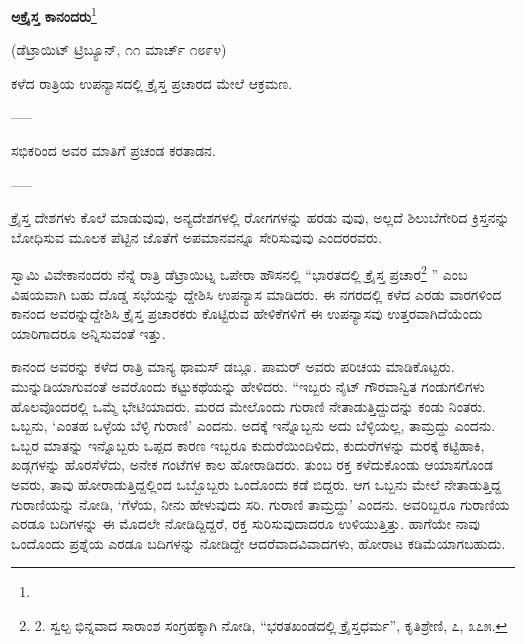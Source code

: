 \begin{center}
\textbf{ಅಕ್ರೈಸ್ತ ಕಾನಂದರು}\footnote{}
\end{center}

\begin{center}
(ಡೆಟ್ರಾಯಿಟ್ ಟ್ರಿಬ್ಯೂನ್, ೧೧ ಮಾರ್ಚ್ ೧೮೯೪)
\end{center}

\begin{center}
ಕಳೆದ ರಾತ್ರಿಯ ಉಪನ್ಯಾಸದಲ್ಲಿ ಕ್ರೈಸ್ತ ಪ್ರಚಾರದ ಮೇಲೆ ಆಕ್ರಮಣ.
\end{center}

\begin{center}
-----
\end{center}

\begin{center}
ಸಭಿಕರಿಂದ ಅವರ ಮಾತಿಗೆ ಪ್ರಚಂಡ ಕರತಾಡನ.
\end{center}

\begin{center}
-----
\end{center}

ಕ್ರೈಸ್ತ ದೇಶಗಳು ಕೊಲೆ ಮಾಡುವುವು, ಅನ್ಯದೇಶಗಳಲ್ಲಿ ರೋಗಗಳನ್ನು ಹರಡು ವುವು, ಅಲ್ಲದೆ ಶಿಲುಬೆಗೇರಿದ ಕ್ರಿಸ್ತನನ್ನು ಬೋಧಿಸುವ ಮೂಲಕ ಪೆಟ್ಟಿನ ಜೊತೆಗೆ ಅಪಮಾನವನ್ನೂ ಸೇರಿಸುವುವು ಎಂದರರವರು.

ಸ್ವಾಮಿ ವಿವೇಕಾನಂದರು ನೆನ್ನೆ ರಾತ್ರಿ ಡೆಟ್ರಾಯಿಟ್ನ ಒಪೇರಾ ಹೌಸನಲ್ಲಿ “ಭಾರತದಲ್ಲಿ ಕ್ರೈಸ್ತ ಪ್ರಚಾರ\footnote{2. ಸ್ವಲ್ಪ ಭಿನ್ನವಾದ ಸಾರಾಂಶ ಸಂಗ್ರಹಕ್ಕಾಗಿ ನೋಡಿ, “ಭರತಖಂಡದಲ್ಲಿ ಕ್ರೈಸ್ತಧರ್ಮ”, ಕೃತಿಶ್ರೇಣಿ, ೭, ೩೭೫.} ” ಎಂಬ ವಿಷಯವಾಗಿ ಬಹು ದೊಡ್ಡ ಸಭೆಯನ್ನು ದ್ದೇಶಿಸಿ ಉಪನ್ಯಾಸ ಮಾಡಿದರು. ಈ ನಗರದಲ್ಲಿ ಕಳೆದ ಎರಡು ವಾರಗಳಿಂದ ಕಾನಂದ ಅವರನ್ನುದ್ದೇಶಿಸಿ ಕ್ರೈಸ್ತ ಪ್ರಚಾರಕರು ಕೊಟ್ಟಿರುವ ಹೇಳಿಕೆಗಳಿಗೆ ಈ ಉಪನ್ಯಾಸವು ಉತ್ತರವಾಗಿದೆಯೆಂದು ಯಾರಿಗಾದರೂ ಅನ್ನಿಸುವಂತೆ ಇತ್ತು.

ಕಾನಂದ ಅವರನ್ನು ಕಳೆದ ರಾತ್ರಿ ಮಾನ್ಯ ಥಾಮಸ್ ಡಬ್ಲೂ. ಪಾಮರ್ ಅವರು ಪರಿಚಯ ಮಾಡಿಕೊಟ್ಟರು. ಮುನ್ನುಡಿಯಾಗುವಂತೆ ಅವರೊಂದು ಕಟ್ಟುಕಥೆಯನ್ನು ಹೇಳಿದರು. “ಇಬ್ಬರು ನೈಟ್ ಗೌರವಾನ್ವಿತ ಗಂಡುಗಲಿಗಳು ಹೊಲವೊಂದರಲ್ಲಿ ಒಮ್ಮೆ ಭೇಟಿಯಾದರು. ಮರದ ಮೇಲೊಂದು ಗುರಾಣಿ ನೇತಾಡುತ್ತಿದ್ದುದನ್ನು ಕಂಡು ನಿಂತರು. ಒಬ್ಬನು, ‘ಎಂತಹ ಒಳ್ಳೆಯ ಬೆಳ್ಳಿ ಗುರಾಣಿ’ ಎಂದನು. ಅದಕ್ಕೆ ಇನ್ನೊಬ್ಬನು ಅದು ಬೆಳ್ಳಿಯಲ್ಲ, ತಾಮ್ರದ್ದು ಎಂದನು. ಒಬ್ಬರ ಮಾತನ್ನು ಇನ್ನೊಬ್ಬರು ಒಪ್ಪದ ಕಾರಣ ಇಬ್ಬರೂ ಕುದುರೆಯಿಂದಿಳಿದು, ಕುದುರೆಗಳನ್ನು ಮರಕ್ಕೆ ಕಟ್ಟಿಹಾಕಿ, ಖಡ್ಗಗಳನ್ನು ಹೊರಸೆಳೆದು, ಅನೇಕ ಗಂಟೆಗಳ ಕಾಲ ಹೋರಾಡಿದರು. ತುಂಬ ರಕ್ತ ಕಳೆದುಕೊಂಡು ಆಯಾಸಗೊಂಡ ಅವರು, ತಾವು ಹೋರಾಡುತ್ತಿದ್ದಲ್ಲಿಂದ ಒಬ್ಬೊಬ್ಬರು ಒಂದೊಂದು ಕಡೆ ಬಿದ್ದರು. ಆಗ ಒಬ್ಬನು ಮೇಲೆ ನೇತಾಡುತ್ತಿದ್ದ ಗುರಾಣಿಯನ್ನು ನೋಡಿ, ‘ಗೆಳೆಯ, ನೀನು ಹೇಳುವುದು ಸರಿ. ಗುರಾಣಿ ತಾಮ್ರದ್ದು’ ಎಂದನು. ಅವರಿಬ್ಬರೂ ಗುರಾಣಿಯ ಎರಡೂ ಬದಿಗಳನ್ನು ಈ ಮೊದಲೇ ನೋಡಿದ್ದಿದ್ದರೆ, ರಕ್ತ ಸುರಿಸುವುದಾದರೂ ಉಳಿಯುತ್ತಿತ್ತು. ಹಾಗೆಯೇ ನಾವು ಒಂದೊಂದು ಪ್ರಶ್ನೆಯ ಎರಡೂ ಬದಿಗಳನ್ನು ನೋಡಿದ್ದೇ ಆದರೆವಾದವಿವಾದಗಳು, ಹೋರಾಟ ಕಡಿಮೆಯಾಗಬಹುದು.


